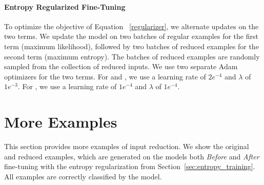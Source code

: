 \paragraph{Entropy Regularized Fine-Tuning}
To optimize the objective of Equation ~\ref{regularizer}, we alternate
updates on the two terms. We update the model on two
batches of regular examples for the first term (maximum likelihood), followed
by two batches of reduced examples for the second term (maximum entropy). The batches of
reduced examples are randomly sampled from the collection of reduced
inputs. We use two separate Adam~\cite{kingma2015adam} optimizers for
the two terms.  For \squad{} and \snli{}, we use a learning rate of
$2e^{-4}$ and $\lambda$ of $1e^{-3}$.  For \vqa{}, we use a learning
rate of $1e^{-4}$ and $\lambda$ of $1e^{-4}$.

\section{More Examples}
\label{sec:example_supplemental}

This section provides more examples of input reduction.  We show
the original and reduced examples, which are generated on the models both 
\emph{Before} and \emph{After} fine-tuning with the entropy regularization from
Section~\ref{sec:entropy_training}. All examples are correctly classified by the model.

